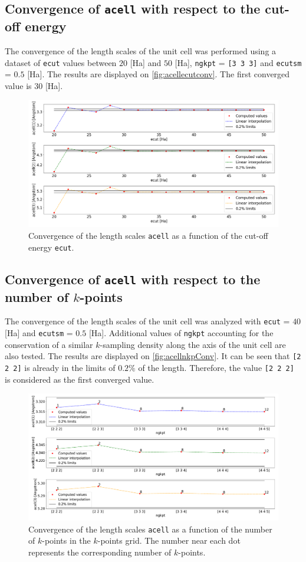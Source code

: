 \documentclass[11pt,a4paper]{article}
\begin{document}
\subsection{Convergence of \texttt{acell} with respect to the cut-off energy}
The convergence of the length scales of the unit cell was performed using a dataset of \texttt{ecut} values between $20$ [Ha] and $50$ [Ha], \texttt{ngkpt} = \texttt{[3 3 3]} and \texttt{ecutsm} = $0.5$ [Ha]. The results are displayed on \autoref{fig:acellecutconv}.
The first converged value is $30$ [Ha].
\begin{figure}
\centering
\includegraphics[width=\textwidth]{images/acellConv.png}
\caption{Convergence of the length scales \texttt{acell} as a function of the cut-off energy \texttt{ecut}.}
\label{fig:acellecutconv}
\end{figure}
\subsection{Convergence of \texttt{acell} with respect to the number of $k$-points}
The convergence of the length scales of the unit cell was analyzed with \texttt{ecut} = $40$ [Ha] and \texttt{ecutsm} = $0.5$ [Ha]. Additional values of \texttt{ngkpt} accounting for the conservation of a similar $k$-sampling density along the axis of the unit cell are also tested. The results are displayed on \autoref{fig:acellnkpConv}. It can be seen that \texttt{[2 2 2]} is already in the limits of $0.2\%$ of the length. Therefore, the value \texttt{[2 2 2]} is considered as the first converged value.
\begin{figure}
\centering
\includegraphics[width=\textwidth]{images/acellNgkpt.pdf}
\caption{Convergence of the length scales \texttt{acell} as a function of the number of $k$-points in the $k$-points grid.
The number near each dot represents the corresponding number of $k$-points.}
\label{fig:acellnkpConv}
\end{figure}
\end{document}
